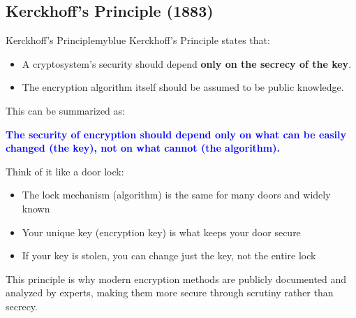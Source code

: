\subsection{Kerckhoff's Principle (1883)}
\begin{prettyBox}{Kerckhoff's Principle}{myblue}
Kerckhoff's Principle states that:

\begin{itemize}
    \item A cryptosystem's security should depend \textbf{only on the secrecy of the key}.
    \item The encryption algorithm itself should be assumed to be public knowledge.
\end{itemize}

This can be summarized as:

\begin{center}
\colorbox{green!50!white}{\parbox{0.8\textwidth}{
    \centering \textbf{\textcolor{blue}{The security of encryption should depend only on what can be easily changed (the key), not on what cannot (the algorithm).}}
}}
\end{center}

Think of it like a door lock:
\begin{itemize}
    \item The lock mechanism (algorithm) is the same for many doors and widely known
    \item Your unique key (encryption key) is what keeps your door secure
    \item If your key is stolen, you can change just the key, not the entire lock
\end{itemize}

This principle is why modern encryption methods are publicly documented and analyzed by experts, making them more secure through scrutiny rather than secrecy.
\end{prettyBox}
